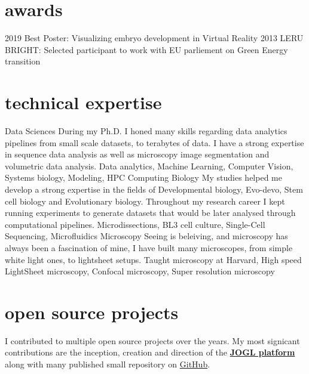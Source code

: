 \documentclass[]{twentysecondcv}
\begin{document}
\makeprofileskills

\section{awards}

\begin{twentyshort}
  \twentyitemshort
    {2019}
    {Best Poster: Visualizing embryo development in Virtual Reality}
  \twentyitemshort
    {2013}
    {LERU BRIGHT: Selected participant to work with EU parliement on Green Energy transition}
\end{twentyshort}

\section{technical expertise}

\begin{twenty}
  \twentyitemexpertise
    {Data Sciences}
    {During my Ph.D. I honed many skills regarding data analytics pipelines from small scale datasets, to terabytes of data. I have a strong expertise in sequence data analysis as well as microscopy image segmentation and volumetric data analysis.}
    {{Data analytics}, {Machine Learning}, {Computer Vision}, {Systems biology}, {Modeling}, {HPC Computing}}
  \twentyitemexpertise
    {Biology}
    {My studies helped me develop a strong expertise in the fields of Developmental biology, Evo-devo, Stem cell biology and Evolutionary biology. Throughout my research career I kept running experiments to generate datasets that would be later analysed through computational pipelines.}
    {{Microdissections}, {BL3 cell culture}, {Single-Cell Sequencing}, {Microfluidics}}
  \twentyitemexpertise
    {Microscopy}
    {Seeing is beleiving, and microscopy has always been a fascination of mine, I have built many microscopes, from simple white light ones, to lightsheet setups.}
    {{Taught microscopy at Harvard}, {High speed LightSheet microscopy}, {Confocal microscopy}, {Super resolution microscopy}}
\end{twenty}

\section{open source projects}
I contributed to multiple open source projects over the years. My most signicant contributions are the inception, creation and direction of the \href{https://gitlab.com/JOGL}{\textbf{JOGL platform}} along with many published small repository on \href{https://github.com/Xqua}{GitHub}.
\end{document}
